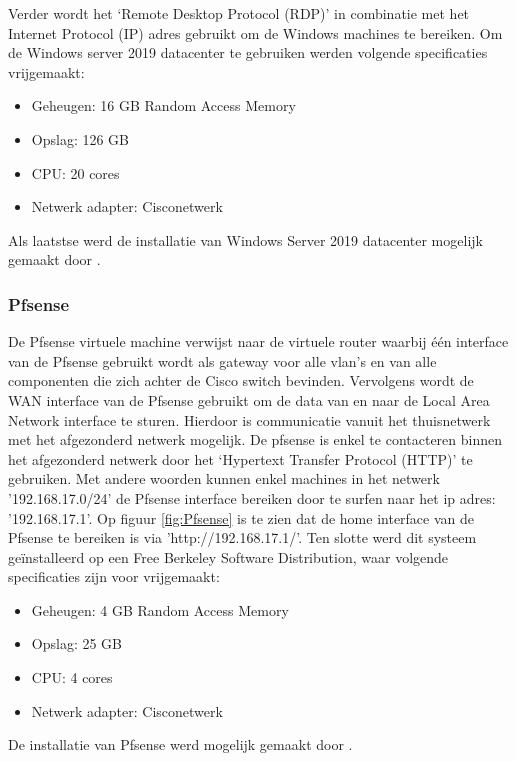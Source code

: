 Verder wordt het ‘Remote Desktop Protocol (RDP)’ in combinatie met het Internet Protocol (IP) adres gebruikt om de Windows machines te bereiken.
\newline
\newline
Om de Windows server 2019 datacenter te gebruiken werden volgende specificaties vrijgemaakt:

\begin{itemize}
	\item Geheugen: 16 GB Random Access Memory
	\item Opslag: 126 GB
	\item CPU: 20 cores
	\item Netwerk adapter: Cisco\textunderscore netwerk
\end{itemize}

Als laatstse werd de installatie van Windows Server 2019 datacenter mogelijk gemaakt door \cite{Win19_InstallationGuide}. 

\subsubsection{Pfsense}
De Pfsense virtuele machine verwijst naar de virtuele router waarbij één interface van de Pfsense gebruikt wordt als gateway voor alle vlan’s en van alle componenten die zich achter de Cisco switch bevinden. Vervolgens wordt de WAN interface van de Pfsense gebruikt om de data van en naar de Local Area Network interface te sturen. Hierdoor is communicatie vanuit het thuisnetwerk met het afgezonderd netwerk mogelijk.
\newline
\newline
De pfsense is enkel te contacteren binnen het afgezonderd netwerk door het ‘Hypertext Transfer Protocol (HTTP)’ te gebruiken. Met andere woorden kunnen enkel machines in het netwerk '192.168.17.0/24' de Pfsense interface bereiken door te surfen naar het ip adres: '192.168.17.1'. Op figuur \ref{fig:Pfsense} is te zien dat de home interface van de Pfsense te bereiken is via 'http://192.168.17.1/'.
\newline
\newline
Ten slotte werd dit systeem geïnstalleerd op een Free Berkeley Software Distribution, waar volgende specificaties zijn voor vrijgemaakt: 

\begin{itemize}
	\item Geheugen: 4 GB Random Access Memory
	\item Opslag: 25 GB
	\item CPU: 4 cores
	\item Netwerk adapter: Cisco\textunderscore netwerk
\end{itemize}
De installatie van Pfsense werd mogelijk gemaakt door \cite{Pfsense_InstallationGuide}.

